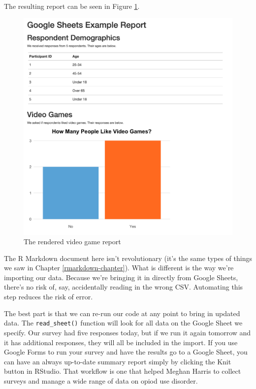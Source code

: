 \documentclass[
]{book}
\begin{document}
The resulting report can be seen in Figure \ref{fig:video-game-report}.

\begin{figure}
\includegraphics[width=1\linewidth]{assets/video-game-report} \caption{The rendered video game report}\label{fig:video-game-report}
\end{figure}

The R Markdown document here isn't revolutionary (it's the same types of things we saw in Chapter \ref{rmarkdown-chapter}). What is different is the way we're importing our data. Because we're bringing it in directly from Google Sheets, there's no risk of, say, accidentally reading in the wrong CSV. Automating this step reduces the risk of error.

The best part is that we can re-run our code at any point to bring in updated data. The \texttt{read\_sheet()} function will look for all data on the Google Sheet we specify. Our survey had five responses today, but if we run it again tomorrow and it has additional responses, they will all be included in the import. If you use Google Forms to run your survey and have the results go to a Google Sheet, you can have an always up-to-date summary report simply by clicking the Knit button in RStudio. That workflow is one that helped Meghan Harris to collect surveys and manage a wide range of data on opiod use disorder.
\end{document}
